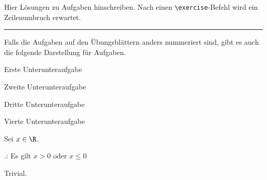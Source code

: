 \documentclass{article}
\begin{document}

Hier Lösungen zu Aufgaben hinschreiben. Nach einen \verb!\exercise!-Befehl wird ein Zeilenumbruch erwartet.

\blindtext[1]
\blindtext[1]

\bigskip\medskip
\hrule


Falls die Aufgaben auf den Übungsblättern anders nummeriert sind, gibt es auch die folgende Darstellung für Aufgaben.

\begin{itemize*}
    \vspace*{-1.5em}
    \item[(i)] Erste Unterunteraufgabe
    \item[(ii)] Zweite Unterunteraufgabe
    \item[(iii)] Dritte Unterunteraufgabe
    \item[(iv)] Vierte Unterunteraufgabe
\end{itemize*}

\blindtext[1]
Sei $x\in\R$.

\zz.: Es gilt $x > 0$ oder $x\le0$
\begin{beweis}
Trivial.\done
\end{beweis}
\end{document}

